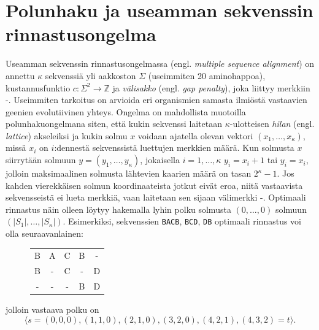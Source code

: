 \documentclass[finnish]{tktltiki2}
\theoremstyle{definition}
\theoremstyle{remark}
\begin{document}
\section{Polunhaku ja useamman sekvenssin rinnastusongelma}
\label{sec:msa}
Useamman sekvenssin rinnastusongelmassa (engl. \textit{multiple sequence alignment}) on annettu $\kappa$ sekvenssiä yli aakkoston $\Sigma$ (useimmiten 20 aminohappoa), kustannusfunktio $c \colon \Sigma^2 \to \mathbb{Z}$ ja \textit{välisakko} (engl. \textit{gap penalty}), joka liittyy merkkiin -. Useimmiten tarkoitus on arvioida eri organismien samasta ilmiöstä vastaavien geenien evolutiivinen yhteys.  Ongelma on mahdollista muotoilla polunhakuongelmana siten, että kukin sekvenssi laitetaan $\kappa$-ulotteisen \textit{hilan} (engl. \textit{lattice}) akseleiksi ja kukin solmu $x$ voidaan ajatella olevan vektori $(x_1, \dots, x_\kappa)$, missä $x_i$ on $i$:dennestä sekvenssistä luettujen merkkien määrä. Kun solmusta $x$ siirrytään solmuun $y = (y_1, \dots, y_\kappa)$, jokaisella $i = 1, \dots, \kappa$ $y_i = x_i + 1$ tai $y_i = x_i$, jolloin maksimaalinen solmusta lähtevien kaarien määrä on tasan $2^\kappa - 1$. Jos kahden vierekkäisen solmun koordinaateista jotkut eivät eroa, niitä vastaavista sekvensseistä ei lueta merkkiä, vaan laitetaan sen sijaan välimerkki -. Optimaali rinnastus näin olleen löytyy hakemalla lyhin polku solmusta $(0, \dots, 0)$ solmuun $(|S_1|, \dots, |S_\kappa|)$. Esimerkiksi, sekvenssien \texttt{BACB}, \texttt{BCD}, \texttt{DB} optimaali rinnastus voi olla seuraavanlainen:
\begin{figure}[H]
\centering
\begin{tabular}{ccccc}
B & A & C & B & - \\
B & - & C & - & D \\
- & - & - & B & D
\end{tabular}
\end{figure}
jolloin vastaava polku on
\[ 
\langle s = (0, 0, 0), (1, 1, 0), (2, 1, 0), (3, 2, 0), (4, 2, 1), (4, 3, 2) = t \rangle.
\]
\end{document}
